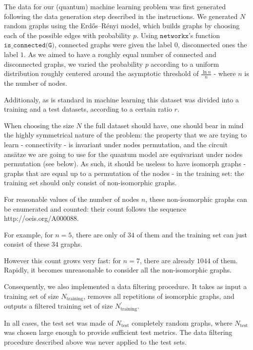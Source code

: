 \documentclass{article}
\theoremstyle{definition}
\theoremstyle{plain}
\begin{document}
The data for our (quantum) machine learning problem was first generated following the data generation step described in the instructions. We generated $N$ random graphs using the Erdős–Rényi model, which builds graphs by choosing each of the possible edges with probability $p$. Using $\texttt{networkx}$'s function $\texttt{is\_connected(G)}$, connected graphs were given the label $0$, disconnected ones the label $1$. As we aimed to have a roughly equal number of connected and disconnected graphs, we varied the probability $p$ according to a uniform distribution roughly centered around the asymptotic threshold of $\frac{\ln n}{n}$ - where $n$ is the number of nodes.

Additionaly, as is standard in machine learning this dataset was divided into a training and a test datasets, according to a certain ratio $r$.

When choosing the size $N$ the full dataset should have, one should bear in mind the highly symmetrical nature of the problem: the property that we are trying to learn - connectivity - is invariant under nodes permutation, and the circuit ansätze we are going to use for the quantum model are equivariant under nodes permutation (see below). As such, it should be useless to have isomorph graphs - graphs that are equal up to a permutation of the nodes - in the training set: the training set should only consist of non-isomorphic graphs.

For reasonable values of the number of nodes $n$, these non-isomorphic graphs can be enumerated and counted: their count follows the sequence http://oeis.org/A000088. 

For example, for $n=5$, there are only of $34$ of them and the training set can just consist of these $34$ graphs.

However this count grows very fast: for $n=7$, there are already $1044$ of them. Rapidly, it becomes unreasonable to consider all the non-isomorphic graphs.

Consequently, we also implemented a data filtering procedure. It takes as input a training set of size $N_{\text{training}}$, removes all repetitions of isomorphic graphs, and outputs a filtered training set of size $N^{'}_{\text{training}}$.

In all cases, the test set was made of $N_{\text{test}}$ completely random graphs, where $N_{\text{test}}$ was chosen large enough to provide sufficient test metrics. The data filtering procedure described above was never applied to the test sets.
\end{document}
